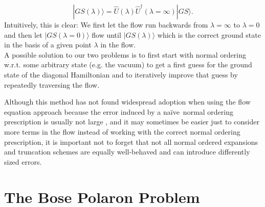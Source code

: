 \begin{equation}
|GS(\lambda)\rangle = \hat U(\lambda)\hat U^\dagger(\lambda=\infty)|GS\rangle.
\end{equation}
Intuitively, this is clear: We first let the flow run backwards from $\lambda=\infty$ to $\lambda = 0$ and then let $|GS(\lambda=0)\rangle$ flow until $|GS(\lambda)\rangle$ which is the correct ground state in the basis of a given point $\lambda$ in the flow.\\
A possible solution to our two problems is to first start with normal ordering w.r.t. some arbitrary state (e.g. the vacuum) to get a first guess for the ground state of the diagonal Hamiltonian and to iteratively improve that guess by repeatedly traversing the flow. \par
Although this method has not found widespread adoption when using the flow equation approach because the error induced by a \grqq na\"ive\grqq\  normal ordering prescription is usually not large \cite{kehrein2006flow}, and it may sometimes be easier just to consider more terms in the flow instead of working with the correct normal ordering prescription, it is important not to forget that not all normal ordered expansions and truncation schemes are equally well-behaved and can introduce differently sized errors.

\section{The Bose Polaron Problem}
